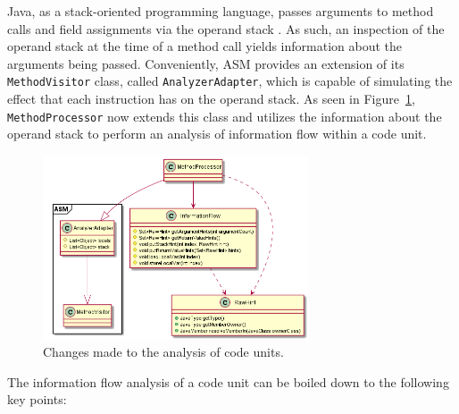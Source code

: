 Java, as a stack-oriented programming language, passes arguments to method calls and field assignments via the operand stack \cite{hutchison_information_2005}. As such, an inspection of the operand stack at the time of a method call yields information about the arguments being passed.
Conveniently, ASM provides an extension of its \texttt{MethodVisitor} class, called \texttt{AnalyzerAdapter}, which is capable of simulating the effect that each instruction has on the operand stack. As seen in Figure~\ref{fig:method_processor_2}, \texttt{MethodProcessor} now extends this class and utilizes the information about the operand stack to perform an analysis of information flow within a code unit.

\begin{figure}
    \centering
    \includegraphics[width=0.7\textwidth]{figure/extension/MethodProcessor2.png}
    \caption{Changes made to the analysis of code units.}
    \label{fig:method_processor_2}
\end{figure}

The information flow analysis of a code unit can be boiled down to the following key points:

